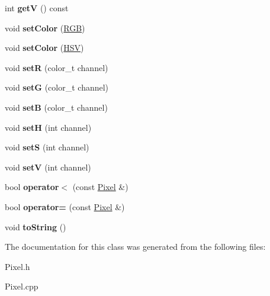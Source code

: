 \begin{DoxyCompactItemize}
\item 
\hypertarget{class_pixel_a921f6b0a83075c52491280eeec29e38b}{int {\bfseries get\-V} () const }\label{class_pixel_a921f6b0a83075c52491280eeec29e38b}

\item 
\hypertarget{class_pixel_a3a632ce38ad1a93a65406114f08cd628}{void {\bfseries set\-Color} (\hyperlink{struct_r_g_b}{R\-G\-B})}\label{class_pixel_a3a632ce38ad1a93a65406114f08cd628}

\item 
\hypertarget{class_pixel_a1d004a491b2c5ee95880a70d7cf21b86}{void {\bfseries set\-Color} (\hyperlink{struct_h_s_v}{H\-S\-V})}\label{class_pixel_a1d004a491b2c5ee95880a70d7cf21b86}

\item 
\hypertarget{class_pixel_a7669a7187a0d2a009de71c77871b58de}{void {\bfseries set\-R} (color\-\_\-t channel)}\label{class_pixel_a7669a7187a0d2a009de71c77871b58de}

\item 
\hypertarget{class_pixel_a3d4e74403f26074ba90a426d993088a9}{void {\bfseries set\-G} (color\-\_\-t channel)}\label{class_pixel_a3d4e74403f26074ba90a426d993088a9}

\item 
\hypertarget{class_pixel_ae1af48d6d61212522a678e3dc4daa22e}{void {\bfseries set\-B} (color\-\_\-t channel)}\label{class_pixel_ae1af48d6d61212522a678e3dc4daa22e}

\item 
\hypertarget{class_pixel_a9235a7497036c9066feeb8d019791bdc}{void {\bfseries set\-H} (int channel)}\label{class_pixel_a9235a7497036c9066feeb8d019791bdc}

\item 
\hypertarget{class_pixel_a0414e865cfc3a1e451f7a80cd7f165b8}{void {\bfseries set\-S} (int channel)}\label{class_pixel_a0414e865cfc3a1e451f7a80cd7f165b8}

\item 
\hypertarget{class_pixel_aa86fd55d3fd189062f94f3e557d3b988}{void {\bfseries set\-V} (int channel)}\label{class_pixel_aa86fd55d3fd189062f94f3e557d3b988}

\item 
\hypertarget{class_pixel_af81a1dc95e90fe9bf836c0e3b27cdbba}{bool {\bfseries operator$<$} (const \hyperlink{class_pixel}{Pixel} \&)}\label{class_pixel_af81a1dc95e90fe9bf836c0e3b27cdbba}

\item 
\hypertarget{class_pixel_a0b56df19ddd3e7b7c53107047ff9083b}{bool {\bfseries operator=} (const \hyperlink{class_pixel}{Pixel} \&)}\label{class_pixel_a0b56df19ddd3e7b7c53107047ff9083b}

\item 
\hypertarget{class_pixel_abded9446d55db7ec7eff0beb52d5c5a4}{void {\bfseries to\-String} ()}\label{class_pixel_abded9446d55db7ec7eff0beb52d5c5a4}

\end{DoxyCompactItemize}


The documentation for this class was generated from the following files\-:\begin{DoxyCompactItemize}
\item 
Pixel.\-h\item 
Pixel.\-cpp\end{DoxyCompactItemize}
